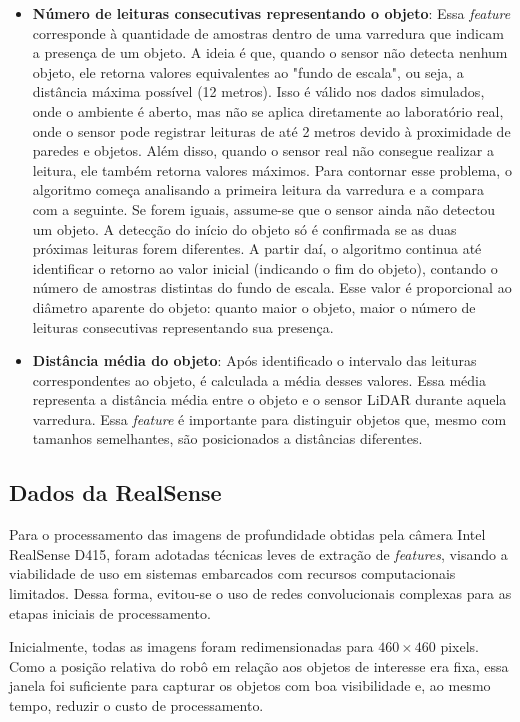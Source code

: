 \begin{itemize}
    \item \textbf{Número de leituras consecutivas representando o objeto}: Essa \textit{feature} corresponde à quantidade de amostras dentro de uma varredura que indicam a presença de um objeto. A ideia é que, quando o sensor não detecta nenhum objeto, ele retorna valores equivalentes ao "fundo de escala", ou seja, a distância máxima possível (12 metros). Isso é válido nos dados simulados, onde o ambiente é aberto, mas não se aplica diretamente ao laboratório real, onde o sensor pode registrar leituras de até 2 metros devido à proximidade de paredes e objetos. Além disso, quando o sensor real não consegue realizar a leitura, ele também retorna valores máximos. Para contornar esse problema, o algoritmo começa analisando a primeira leitura da varredura e a compara com a seguinte. Se forem iguais, assume-se que o sensor ainda não detectou um objeto. A detecção do início do objeto só é confirmada se as duas próximas leituras forem diferentes. A partir daí, o algoritmo continua até identificar o retorno ao valor inicial (indicando o fim do objeto), contando o número de amostras distintas do fundo de escala. Esse valor é proporcional ao diâmetro aparente do objeto: quanto maior o objeto, maior o número de leituras consecutivas representando sua presença.
    
    \item \textbf{Distância média do objeto}: Após identificado o intervalo das leituras correspondentes ao objeto, é calculada a média desses valores. Essa média representa a distância média entre o objeto e o sensor LiDAR durante aquela varredura. Essa \textit{feature} é importante para distinguir objetos que, mesmo com tamanhos semelhantes, são posicionados a distâncias diferentes.
\end{itemize}

\subsection{Dados da RealSense}

Para o processamento das imagens de profundidade obtidas pela câmera Intel RealSense D415, foram adotadas técnicas leves de extração de \textit{features}, visando a viabilidade de uso em sistemas embarcados com recursos computacionais limitados. Dessa forma, evitou-se o uso de redes convolucionais complexas para as etapas iniciais de processamento.

Inicialmente, todas as imagens foram redimensionadas para $460 \times 460$ pixels. Como a posição relativa do robô em relação aos objetos de interesse era fixa, essa janela foi suficiente para capturar os objetos com boa visibilidade e, ao mesmo tempo, reduzir o custo de processamento.

